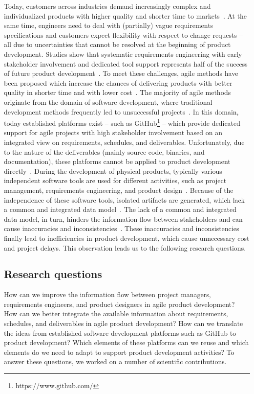     Today, customers across industries demand increasingly complex and individualized products with higher quality and shorter time to markets~\cite{Ahti2005}.
    At the same time, engineers need to deal with (partially) vague requirements specifications and customers expect flexibility with respect to change requests -- all due to uncertainties that cannot be resolved at the beginning of product development.
    Studies show that systematic requirements engineering with early stakeholder involvement and dedicated tool support represents half of the success of future product development~\cite{6226784}.
    To meet these challenges, agile methods have been proposed which increase the chances of delivering products with better quality in shorter time and with lower cost~\cite{ozkan2019agile}. 
    The majority of agile methods originate from the domain of software development, where traditional development methods frequently led to unsuccessful projects~\cite{HEIMICKE2021786}.
    In this domain, today established platforms exist -- such as GitHub\footnote{https://www.github.com/} -- which provide dedicated support for agile projects with high stakeholder involvement based on an integrated view on requirements, schedules, and deliverables.
    Unfortunately, due to the nature of the deliverables (mainly source code, binaries, and documentation), these platforms cannot be applied to product development directly~\cite{HEIMICKE2021786}. 
    During the development of physical products, typically various independent software tools are used for different activities, such as project management, requirements engineering, and product design~\cite{MarionTucker}.
    Because of the independence of these software tools, isolated artifacts are generated, which lack a common and integrated data model~\cite{houshmand2010collaborative}.
    The lack of a common and integrated data model, in turn, hinders the information flow between stakeholders and can cause inaccuracies and inconsistencies~\cite{Jorma2014}.
    These inaccuracies and inconsistencies finally lead to inefficiencies in product development, which cause unnecessary cost and project delays.
    This observation leads us to the following research questions.
    
    \subsection*{Research questions}
    How can we improve the information flow between project managers, requirements engineers, and product designers in agile product development?
    How can we better integrate the available information about requirements, schedules, and deliverables in agile product development?
    How can we translate the ideas from established software development platforms such as GitHub to product development?
    Which elements of these platforms can we reuse and which elements do we need to adapt to support product development activities?
    To answer these questions, we worked on a number of scientific contributions.

